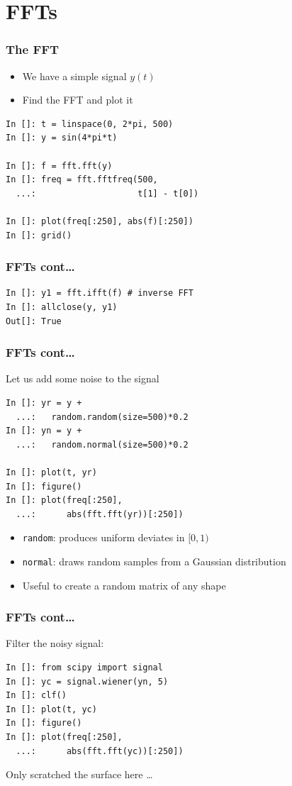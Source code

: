 \documentclass[14pt,compress]{beamer}
\newcounter{time}
\newcommand{\inctime}[1]{\addtocounter{time}{#1}{\tiny \thetime\ m}}
\newcommand{\typ}[1]{\lstinline{#1}}
\begin{document}
\section{FFTs}

\begin{frame}[fragile]
\frametitle{The FFT}
\begin{itemize}
    \item We have a simple signal $y(t)$
    \item Find the FFT and plot it
\end{itemize}
\begin{lstlisting}
In []: t = linspace(0, 2*pi, 500)
In []: y = sin(4*pi*t)

In []: f = fft.fft(y)
In []: freq = fft.fftfreq(500,
  ...:                    t[1] - t[0])

In []: plot(freq[:250], abs(f)[:250])
In []: grid()
\end{lstlisting}
\end{frame}

\begin{frame}[fragile]
\frametitle{FFTs cont\dots}
\begin{lstlisting}
In []: y1 = fft.ifft(f) # inverse FFT
In []: allclose(y, y1)
Out[]: True
\end{lstlisting}
\end{frame}

\begin{frame}[fragile]
\frametitle{FFTs cont\dots}
Let us add some noise to the signal
\begin{lstlisting}
In []: yr = y +
  ...:   random.random(size=500)*0.2
In []: yn = y +
  ...:   random.normal(size=500)*0.2

In []: plot(t, yr)
In []: figure()
In []: plot(freq[:250],
  ...:      abs(fft.fft(yr))[:250])
\end{lstlisting}
\begin{itemize}
    \item \typ{random}: produces uniform deviates in $[0, 1)$
    \item \typ{normal}: draws random samples from a Gaussian
        distribution
    \item Useful to create a random matrix of any shape
\end{itemize}
\end{frame}

\begin{frame}[fragile]
\frametitle{FFTs cont\dots}
Filter the noisy signal:
\begin{lstlisting}
In []: from scipy import signal
In []: yc = signal.wiener(yn, 5)
In []: clf()
In []: plot(t, yc)
In []: figure()
In []: plot(freq[:250],
  ...:      abs(fft.fft(yc))[:250])
\end{lstlisting}
Only scratched the surface here \dots

\inctime{10}
\end{frame}
\end{document}
